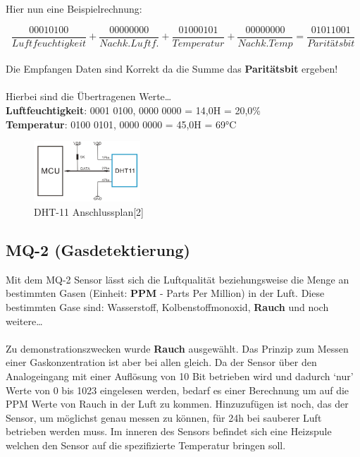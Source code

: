 \documentclass[a4paper, 11pt]{article}
\begin{document}
Hier nun eine Beispielrechnung:

$$ %
\frac{0001 0100}{Luftfeuchtigkeit} + \frac{0000 0000}{Nachk.Luftf.}
 + \frac{0100 0101}{Temperatur} + \frac{0000 0000}{Nachk.Temp}
 = \frac{0101 1001}{Paritätsbit}
$$
\\
Die Empfangen Daten sind Korrekt da die Summe das \textbf{Paritätsbit} ergeben!
\\\\
Hierbei sind die Übertragenen Werte\ldots\\
\textbf{Luftfeuchtigkeit}: 0001 0100, 0000 0000 = 14,0H = 20,0\%\\
\textbf{Temperatur}: 0100 0101, 0000 0000 = 45,0H = 69°C 

\begin{figure}[h]
    \begin{center}
        \includegraphics[width=4cm]{dht11_schem.png}
    \caption{DHT-11 Anschlussplan[2]}
    \end{center}
\end{figure}

\newpage
\subsection{MQ-2 (Gasdetektierung)}
Mit dem MQ-2 Sensor lässt sich die Luftqualität beziehungsweise die
Menge an bestimmten Gasen (Einheit: \textbf{PPM} - Parts Per Million) in der Luft.
Diese bestimmten Gase sind: Wasserstoff, Kolbenstoffmonoxid, \textbf{Rauch} und
noch weitere\ldots\\
\\
Zu demonstrationszwecken wurde \textbf{Rauch} ausgewählt. Das Prinzip zum Messen
einer Gaskonzentration ist aber bei allen gleich.
Da der Sensor über den Analogeingang mit einer Auflösung von 10 Bit
betrieben wird und dadurch `nur' Werte von 0 bis 1023 eingelesen werden, bedarf
es einer Berechnung um auf die PPM Werte von Rauch in der Luft zu kommen.
Hinzuzufügen ist noch, das der Sensor, um möglichst genau messen zu können, für
24h bei sauberer Luft betrieben werden muss. Im inneren des Sensors befindet
sich eine Heizspule welchen den Sensor auf die spezifizierte Temperatur bringen
soll.
\end{document}
